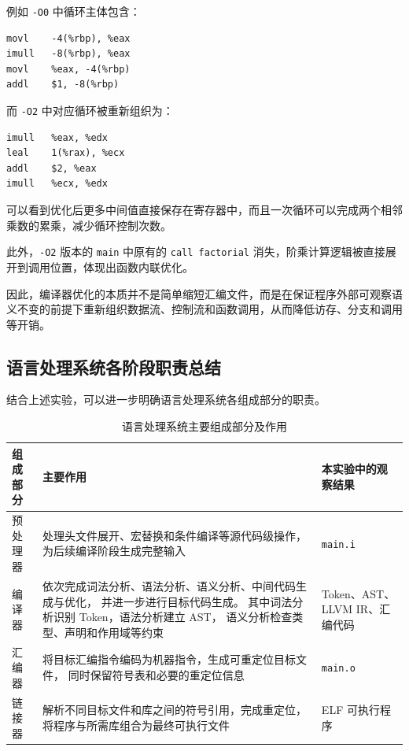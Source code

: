 \documentclass[12pt,a4paper]{ctexart}
\begin{document}
例如 \texttt{-O0} 中循环主体包含：

\begin{lstlisting}
movl    -4(%rbp), %eax
imull   -8(%rbp), %eax
movl    %eax, -4(%rbp)
addl    $1, -8(%rbp)
\end{lstlisting}

而 \texttt{-O2} 中对应循环被重新组织为：

\begin{lstlisting}
imull   %eax, %edx
leal    1(%rax), %ecx
addl    $2, %eax
imull   %ecx, %edx
\end{lstlisting}

可以看到优化后更多中间值直接保存在寄存器中，而且一次循环可以完成两个相邻乘数的累乘，减少循环控制次数。

此外，\texttt{-O2} 版本的 \texttt{main} 中原有的 \texttt{call factorial} 消失，阶乘计算逻辑被直接展开到调用位置，体现出函数内联优化。

因此，编译器优化的本质并不是简单缩短汇编文件，而是在保证程序外部可观察语义不变的前提下重新组织数据流、控制流和函数调用，从而降低访存、分支和调用等开销。

\subsection{语言处理系统各阶段职责总结}

结合上述实验，可以进一步明确语言处理系统各组成部分的职责。

\begin{table}[H]
\centering
\caption{语言处理系统主要组成部分及作用}
\begin{tabularx}{\textwidth}{@{}p{2.5cm}X p{2.8cm}@{}}
\toprule
组成部分 & 主要作用 & 本实验中的观察结果 \\
\midrule

预处理器 &
处理头文件展开、宏替换和条件编译等源代码级操作，
为后续编译阶段生成完整输入 &
\texttt{main.i} \\

编译器 &
依次完成词法分析、语法分析、语义分析、中间代码生成与优化，
并进一步进行目标代码生成。
其中词法分析识别 Token，语法分析建立 AST，
语义分析检查类型、声明和作用域等约束 &
Token、AST、LLVM IR、汇编代码 \\

汇编器 &
将目标汇编指令编码为机器指令，生成可重定位目标文件，
同时保留符号表和必要的重定位信息 &
\texttt{main.o} \\

链接器 &
解析不同目标文件和库之间的符号引用，完成重定位，
将程序与所需库组合为最终可执行文件 &
ELF 可执行程序 \\

\bottomrule
\end{tabularx}
\end{table}
\end{document}
